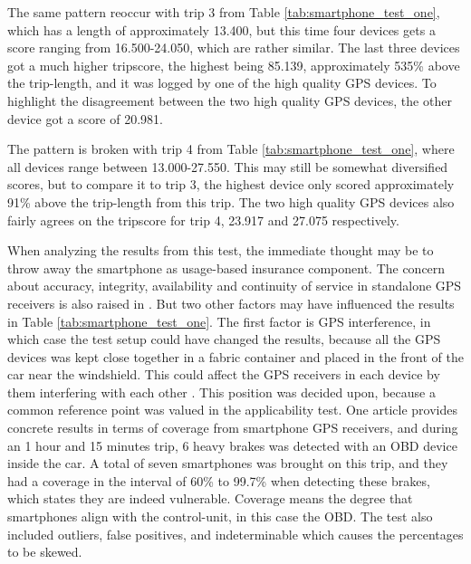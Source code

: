 The same pattern reoccur with trip 3 from Table \ref{tab:smartphone_test_one}, which has a length of approximately 13.400, but this time four devices gets a score ranging from 16.500-24.050, which are rather similar. The last three devices got a much higher tripscore, the highest being 85.139, approximately 535\% above the trip-length, and it was logged by one of the high quality GPS devices. To highlight the disagreement between the two high quality GPS devices, the other device got a score of 20.981. 

The pattern is broken with trip 4 from Table \ref{tab:smartphone_test_one}, where all devices range between 13.000-27.550. This may still be somewhat diversified scores, but to compare it to trip 3, the highest device only scored approximately 91\% above the trip-length from this trip. The two high quality GPS devices also fairly agrees on the tripscore for trip 4, 23.917 and 27.075 respectively. 

When analyzing the results from this test, the immediate thought may be to throw away the smartphone as usage-based insurance component. The concern about accuracy, integrity, availability and continuity of service in standalone GPS receivers is also raised in \citep{art:challenges_smartphone_ubi} \citep{art:survey_mobile_phone_sensing} \citep{art:smartphones_for_monitoring_and_ubi} \citep{art:insurtelematics} \citep{art:in-car_positioning_technologies}. But two other factors may have influenced the results in Table \ref{tab:smartphone_test_one}. The first factor is GPS interference, in which case the test setup could have changed the results, because all the GPS devices was kept close together in a fabric container and placed in the front of the car near the windshield. This could affect the GPS receivers in each device by them interfering with each other \citep{art:gps_interference_two} \citep{art:gps_interference_one}. This position was decided upon, because a common reference point was valued in the applicability test. One article provides concrete results in terms of coverage from smartphone GPS receivers, and during an 1 hour and 15 minutes trip, 6 heavy brakes was detected with an OBD device inside the car. A total of seven smartphones was brought on this trip, and they had a coverage in the interval of 60\% to 99.7\% when detecting these brakes\citep{art:insurtelematics}, which states they are indeed vulnerable. Coverage means the degree that smartphones align with the control-unit, in this case the OBD. The test also included outliers, false positives, and indeterminable which causes the percentages to be skewed.

